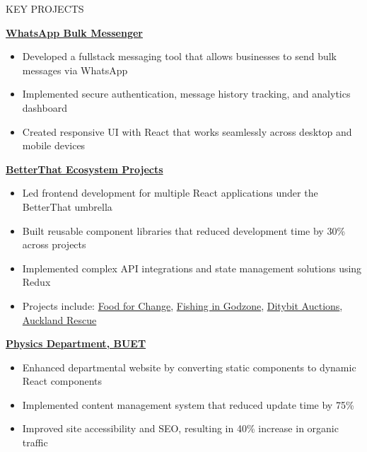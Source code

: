 \documentclass{resume} %
\begin{document}
\begin{rSection}{KEY PROJECTS}
\item \textbf{\href{https://github.com/rafidrahman1/whatsapp.git}{WhatsApp Bulk Messenger}}
\begin{itemize}
    \itemsep -3pt {}
    \item Developed a fullstack messaging tool that allows businesses to send bulk messages via WhatsApp
    \item Implemented secure authentication, message history tracking, and analytics dashboard
    \item Created responsive UI with React that works seamlessly across desktop and mobile devices
\end{itemize}

\item \textbf{\href{https://betterthat.com/}{BetterThat Ecosystem Projects}}
\begin{itemize}
    \itemsep -3pt {}
    \item Led frontend development for multiple React applications under the BetterThat umbrella
    \item Built reusable component libraries that reduced development time by 30\% across projects
    \item Implemented complex API integrations and state management solutions using Redux
    \item Projects include: \href{https://ffc.betterthatconnect.com/}{Food for Change}, \href{https://fig.betterthatconnect.com/}{Fishing in Godzone}, \href{https://ditybit.com/}{Ditybit Auctions}, \href{https://ar.betterthatconnect.com/}{Auckland Rescue}
\end{itemize}

\item \textbf{\href{https://phy.buet.ac.bd/}{Physics Department, BUET}}
\begin{itemize}
    \itemsep -3pt {}
    \item Enhanced departmental website by converting static components to dynamic React components
    \item Implemented content management system that reduced update time by 75\%
    \item Improved site accessibility and SEO, resulting in 40\% increase in organic traffic
\end{itemize}
\end{rSection}

\end{document}
